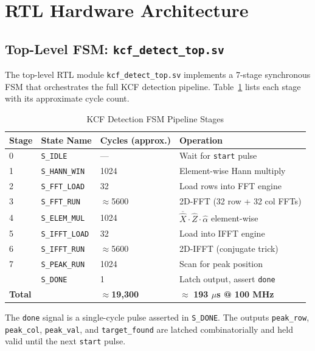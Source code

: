 \documentclass[a4paper,12pt]{report}
\begin{document}
\section{RTL Hardware Architecture}

\subsection{Top-Level FSM: \texttt{kcf\_detect\_top.sv}}

The top-level RTL module \texttt{kcf\_detect\_top.sv} implements a 7-stage synchronous FSM that orchestrates the full KCF detection pipeline. Table~\ref{tab:fsm} lists each stage with its approximate cycle count.

\begin{table}[ht]
\centering
\caption{KCF Detection FSM Pipeline Stages}
\vspace{0.2cm}
\label{tab:fsm}
\begin{tabular}{|l|l|l|l|}
\hline
\textbf{Stage} & \textbf{State Name} & \textbf{Cycles (approx.)} & \textbf{Operation} \\ \hline
0 & \texttt{S\_IDLE} & --- & Wait for \texttt{start} pulse \\ \hline
1 & \texttt{S\_HANN\_WIN} & 1024 & Element-wise Hann multiply \\ \hline
2 & \texttt{S\_FFT\_LOAD} & 32 & Load rows into FFT engine \\ \hline
3 & \texttt{S\_FFT\_RUN} & $\approx$5600 & 2D-FFT (32 row + 32 col FFTs) \\ \hline
4 & \texttt{S\_ELEM\_MUL} & 1024 & $\overline{\hat{X}} \cdot \hat{Z} \cdot \hat{\alpha}$ element-wise \\ \hline
5 & \texttt{S\_IFFT\_LOAD} & 32 & Load into IFFT engine \\ \hline
6 & \texttt{S\_IFFT\_RUN} & $\approx$5600 & 2D-IFFT (conjugate trick) \\ \hline
7 & \texttt{S\_PEAK\_RUN} & 1024 & Scan for peak position \\ \hline
  & \texttt{S\_DONE} & 1 & Latch output, assert \texttt{done} \\ \hline
\multicolumn{2}{|l|}{\textbf{Total}} & $\approx$\textbf{19{,}300} & $\approx$ \textbf{193 $\mu$s @ 100 MHz} \\ \hline
\end{tabular}
\end{table}

\par The \texttt{done} signal is a single-cycle pulse asserted in \texttt{S\_DONE}. The outputs \texttt{peak\_row}, \texttt{peak\_col}, \texttt{peak\_val}, and \texttt{target\_found} are latched combinatorially and held valid until the next \texttt{start} pulse.
\end{document}
